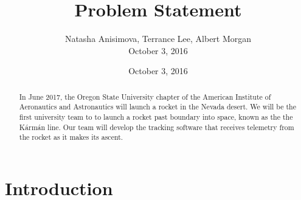 \documentclass[letterpaper,10pt,draftclsnofoot,onecolumn]{IEEEtran}
\title{Problem Statement}
\date{October 3, 2016}
\author{Natasha Anisimova, Terrance Lee, Albert Morgan
	
	October 3, 2016}
\begin{document}
\maketitle
	\tableofcontents


\begin{abstract}
In June 2017, the Oregon State University chapter of the
American Institute of Aeronautics and Astronautics will launch a rocket in the Nevada desert.
We will be the first university team to to launch a rocket past boundary into space,
known as the the Kármán line.
Our team will develop the tracking software that receives
telemetry from the rocket as it makes its ascent.
\end{abstract}
	
	\section{Introduction}
	
	
\end{document}
